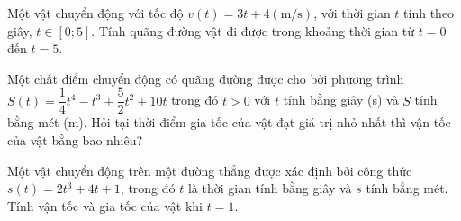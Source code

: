 \begin{bt}%
	Một vật chuyển động với tốc độ $v(t)=3t+4 \mathrm{(m/s)}$, với  thời gian $t$ tính theo giây, $t\in[0;5]$. Tính quãng đường vật đi được trong khoảng thời gian từ $t=0$ đến $t=5$.
\end{bt}

\begin{bt}%

	Một chất điểm chuyển động có quãng đường được cho bởi phương trình $S\left(t\right)=\dfrac{1}{4}t^4-t^3+\dfrac{5}{2}t^2+10t$ trong đó $t>0$ với $t$ tính bằng giây (s) và $S$ tính bằng mét (m). Hỏi tại thời điểm gia tốc của vật đạt giá trị nhỏ nhất thì vận tốc của vật bằng bao nhiêu?
		

\end{bt}

\begin{bt}%
	Một vật chuyển động trên một  đường thẳng được xác định bởi công thức $s(t)=2t^3+4t+1$, trong đó $t$ là thời gian tính bằng giây và $s$ tính bằng mét. Tính vận tốc và gia tốc của vật khi $t=1$.
\end{bt}

